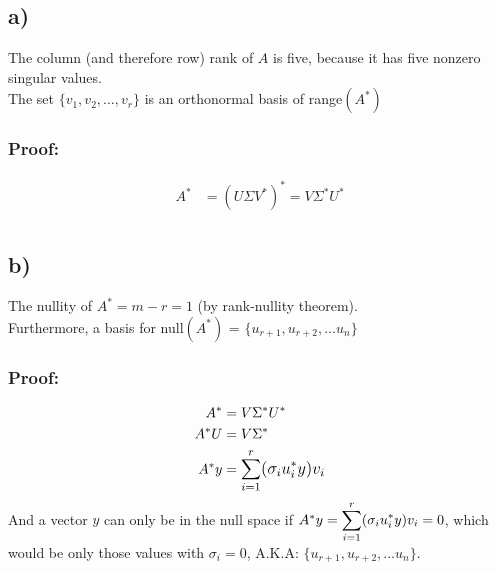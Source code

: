 \documentclass[fleqn]{article}
\begin{document}
\subsection*{a)}
The column (and therefore row) rank of $A$ is five, because it has five nonzero singular values.\\
The set $\{v_1,v_2, \dots ,v_r\}$ is an orthonormal basis of range$(A^{*})$
\subsubsection*{Proof: }
\begin{equation*}
    \begin{split}
        A^{*} &= (U\Sigma V^{*})^{*} = V \Sigma^{*} U^{*}\\
    \end{split}
\end{equation*}
\subsection*{b)}
The nullity of $A^{*} = m - r = 1$ (by rank-nullity theorem).\\
Furthermore, a basis for null$(A^{*})$ = $\{u_{r+1}, u_{r+2}, \dots u_n\}$
\subsubsection*{Proof: }
\begin{equation*}
    \begin{split}
        A^{*} &= V \Sigma^{*} U^{*}\\
        A^{*}U &= V \Sigma^{*}\\
        A^{*}y &= \mathlarger{\sum_{i=1}^{r}(\sigma_{i} u^{*}_i y )v_i}\\
    \end{split}
\end{equation*}
And a vector $y$ can only be in the null space if $A^{*}y = \mathlarger{\sum_{i=1}^{r}(\sigma_{i} u^{*}_i y )v_i} = 0$, which would be only those values with $\sigma_i=0$, A.K.A: $\{u_{r+1}, u_{r+2}, \dots u_n\}$.
\end{document}
